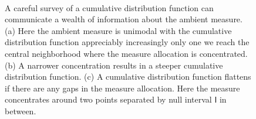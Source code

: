 \documentclass[
  letterpaper,
  DIV=11,
  numbers=noendperiod]{scrartcl}
\begin{document}
\begin{figure}
\begin{minipage}[t]{0.30\linewidth}
{{}

}

\subcaption{\label{fig-cdf-narrow-unimodal}}
\end{minipage}%
%
\begin{minipage}[t]{0.30\linewidth}

{\centering 


}

\subcaption{\label{fig-cdf-gap}}
\end{minipage}%
%
\begin{minipage}[t]{0.05\linewidth}

{\centering 

~

}

\end{minipage}%

\caption{\label{fig-hist-examples}A careful survey of a cumulative
distribution function can communicate a wealth of information about the
ambient measure. (a) Here the ambient measure is unimodal with the
cumulative distribution function appreciably increasingly only one we
reach the central neighborhood where the measure allocation is
concentrated. (b) A narrower concentration results in a steeper
cumulative distribution function. (c) A cumulative distribution function
flattens if there are any gaps in the measure allocation. Here the
measure concentrates around two points separated by null interval
\(\mathsf{I}\) in between.}

\end{figure}
\end{document}
